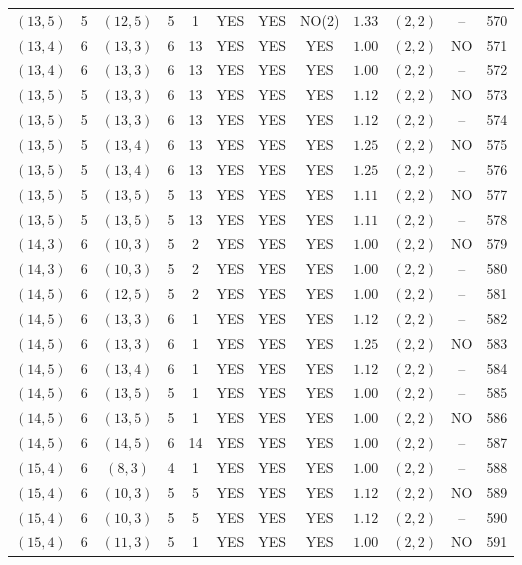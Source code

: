 \begin{longtable}{|c|c|c|c|c|c|c|c|c|c|c|c|}
$(13,5)$ & 5 & $(12,5)$ & 5 & 1 & YES & YES & NO(2) & $1.33$ & $(2,2)$ & -- & 570\\
$(13,4)$ & 6 & $(13,3)$ & 6 & 13 & YES & YES & YES & $1.00$ & $(2,2)$ & NO & 571\\
$(13,4)$ & 6 & $(13,3)$ & 6 & 13 & YES & YES & YES & $1.00$ & $(2,2)$ & -- & 572\\
$(13,5)$ & 5 & $(13,3)$ & 6 & 13 & YES & YES & YES & $1.12$ & $(2,2)$ & NO & 573\\
$(13,5)$ & 5 & $(13,3)$ & 6 & 13 & YES & YES & YES & $1.12$ & $(2,2)$ & -- & 574\\
$(13,5)$ & 5 & $(13,4)$ & 6 & 13 & YES & YES & YES & $1.25$ & $(2,2)$ & NO & 575\\
$(13,5)$ & 5 & $(13,4)$ & 6 & 13 & YES & YES & YES & $1.25$ & $(2,2)$ & -- & 576\\
$(13,5)$ & 5 & $(13,5)$ & 5 & 13 & YES & YES & YES & $1.11$ & $(2,2)$ & NO & 577\\
$(13,5)$ & 5 & $(13,5)$ & 5 & 13 & YES & YES & YES & $1.11$ & $(2,2)$ & -- & 578\\
$(14,3)$ & 6 & $(10,3)$ & 5 & 2 & YES & YES & YES & $1.00$ & $(2,2)$ & NO & 579\\
$(14,3)$ & 6 & $(10,3)$ & 5 & 2 & YES & YES & YES & $1.00$ & $(2,2)$ & -- & 580\\
$(14,5)$ & 6 & $(12,5)$ & 5 & 2 & YES & YES & YES & $1.00$ & $(2,2)$ & -- & 581\\
$(14,5)$ & 6 & $(13,3)$ & 6 & 1 & YES & YES & YES & $1.12$ & $(2,2)$ & -- & 582\\
$(14,5)$ & 6 & $(13,3)$ & 6 & 1 & YES & YES & YES & $1.25$ & $(2,2)$ & NO & 583\\
$(14,5)$ & 6 & $(13,4)$ & 6 & 1 & YES & YES & YES & $1.12$ & $(2,2)$ & -- & 584\\
$(14,5)$ & 6 & $(13,5)$ & 5 & 1 & YES & YES & YES & $1.00$ & $(2,2)$ & -- & 585\\
$(14,5)$ & 6 & $(13,5)$ & 5 & 1 & YES & YES & YES & $1.00$ & $(2,2)$ & NO & 586\\
$(14,5)$ & 6 & $(14,5)$ & 6 & 14 & YES & YES & YES & $1.00$ & $(2,2)$ & -- & 587\\
$(15,4)$ & 6 & $(8,3)$ & 4 & 1 & YES & YES & YES & $1.00$ & $(2,2)$ & -- & 588\\
$(15,4)$ & 6 & $(10,3)$ & 5 & 5 & YES & YES & YES & $1.12$ & $(2,2)$ & NO & 589\\
$(15,4)$ & 6 & $(10,3)$ & 5 & 5 & YES & YES & YES & $1.12$ & $(2,2)$ & -- & 590\\
$(15,4)$ & 6 & $(11,3)$ & 5 & 1 & YES & YES & YES & $1.00$ & $(2,2)$ & NO & 591\\

\end{longtable}
